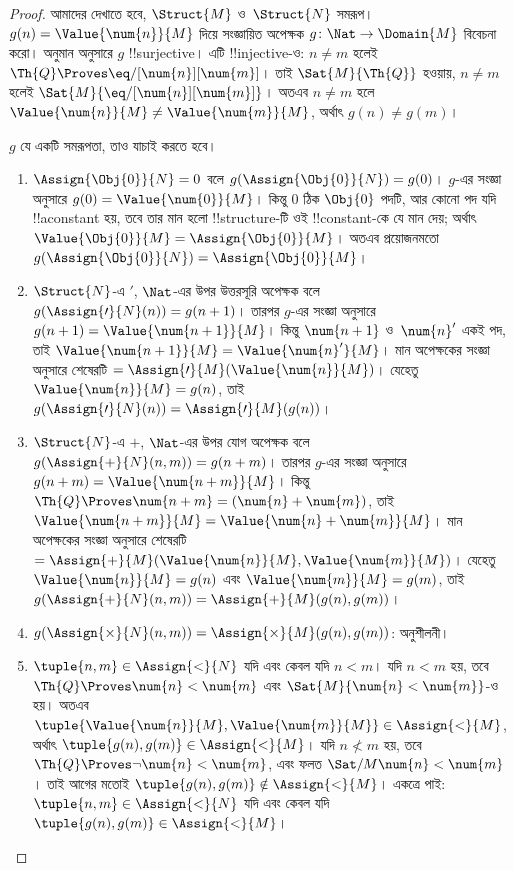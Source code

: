 \documentclass[../../../include/open-logic-section]{subfiles}
\begin{document}
\begin{proof}
আমাদের দেখাতে হবে, $\Struct{M}$ ও~$\Struct{N}$ সমরূপ। $g(n) =
\Value{\num{n}}{M}$ দিয়ে সংজ্ঞায়িত অপেক্ষক $g\colon \Nat \to
\Domain{M}$ বিবেচনা করো। অনুমান অনুসারে $g$ !!{surjective}। এটি
!!{injective}-ও: $n \neq m$ হলেই $\Th{Q} \Proves
\eq/[\num{n}][\num{m}]$। তাই $\Sat{M}{\Th{Q}}$ হওয়ায়, $n \neq m$
হলেই $\Sat{M}{\eq/[\num{n}][\num{m}]}$। অতএব $n \neq m$ হলে
$\Value{\num{n}}{M} \neq \Value{\num{m}}{M}$, অর্থাৎ $g(n) \neq
g(m)$।

$g$ যে একটি সমরূপতা, তাও যাচাই করতে হবে।
\begin{enumerate}
\item $\Assign{\Obj{0}}{N} = 0$ বলে $g(\Assign{\Obj{0}}{N})=g(0)$।
  $g$-এর সংজ্ঞা অনুসারে $g(0)=\Value{\num{0}}{M}$। কিন্তু $\num{0}$
  ঠিক $\Obj{0}$ পদটি, আর কোনো পদ যদি !!a{constant} হয়, তবে তার মান হলো
  !!{structure}-টি ওই !!{constant}-কে যে মান দেয়; অর্থাৎ
  $\Value{\Obj{0}}{M} =
  \Assign{\Obj{0}}{M}$। অতএব প্রয়োজনমতো
  $g(\Assign{\Obj{0}}{N}) = \Assign{\Obj{0}}{M}$।
\item $\Struct{N}$-এ $\prime$, $\Nat$-এর উপর উত্তরসূরি অপেক্ষক বলে
  $g(\Assign{\prime}{N}(n)) = g(n+1)$। তারপর $g$-এর সংজ্ঞা অনুসারে
  $g(n+1) = \Value{\num{n+1}}{M}$। কিন্তু $\num{n+1}$ ও~$\num{n}'$
  একই পদ, তাই $\Value{\num{n+1}}{M} = \Value{\num{n}'}{M}$। মান
  অপেক্ষকের সংজ্ঞা অনুসারে শেষেরটি
  $= \Assign{\prime}{M}(\Value{\num{n}}{M})$। যেহেতু
  $\Value{\num{n}}{M}=g(n)$, তাই
  $g(\Assign{\prime}{N}(n))=\Assign{\prime}{M}(g(n))$।
\item $\Struct{N}$-এ $+$, $\Nat$-এর উপর যোগ অপেক্ষক বলে
  $g(\Assign{+}{N}(n,m)) = g(n+m)$। তারপর $g$-এর সংজ্ঞা অনুসারে
  $g(n+m)=\Value{\num{n+m}}{M}$। কিন্তু $\Th{Q} \Proves
  \num{n+m} = (\num{n} + \num{m})$, তাই
  $\Value{\num{n+m}}{M}=\Value{\num{n}+\num{m}}{M}$। মান অপেক্ষকের
  সংজ্ঞা অনুসারে শেষেরটি
  $=\Assign{+}{M}(\Value{\num{n}}{M},\Value{\num{m}}{M})$। যেহেতু
  $\Value{\num{n}}{M}=g(n)$ এবং $\Value{\num{m}}{M}=g(m)$, তাই
  $g(\Assign{+}{N}(n, m))=\Assign{+}{M}(g(n), g(m))$।
\item $g(\Assign{\times}{N}(n, m)) = \Assign{\times}{M}(g(n), g(m))$:
  অনুশীলনী।
\item $\tuple{n,m} \in \Assign{<}{N}$ যদি এবং কেবল যদি $n<m$। যদি
  $n<m$ হয়, তবে $\Th{Q} \Proves \num{n} < \num{m}$ এবং
  $\Sat{M}{\num{n}<\num{m}}$-ও হয়। অতএব
  $\tuple{\Value{\num{n}}{M}, \Value{\num{m}}{M}} \in
  \Assign{<}{M}$, অর্থাৎ $\tuple{g(n),g(m)} \in \Assign{<}{M}$। যদি
  $n \not< m$ হয়, তবে $\Th{Q} \Proves \lnot \num{n} < \num{m}$,
  এবং ফলত $\Sat/{M}{\num{n}<\num{m}}$। তাই আগের মতোই
  $\tuple{g(n),g(m)} \notin \Assign{<}{M}$। একত্রে পাই:
  $\tuple{n,m} \in \Assign{<}{N}$ যদি এবং কেবল যদি
  $\tuple{g(n),g(m)} \in \Assign{<}{M}$।
\end{enumerate}
\end{proof}
\end{document}
